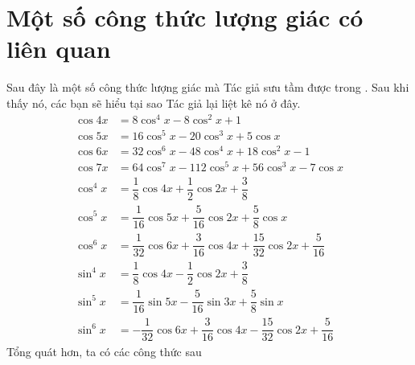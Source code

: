 \documentclass[a4paper,oneside]{book}
\numberwithin{equation}{chapter}
\begin{document}
\section{Một số công thức lượng giác có liên quan}
Sau đây là một số công thức lượng giác mà Tác giả sưu tầm được trong \cite{5}. Sau khi thấy nó, các bạn sẽ hiểu tại sao Tác giả lại liệt kê nó ở đây.\\
\begin{align}
\cos 4x &= 8{\cos ^4}x - 8{\cos ^2}x + 1\\
\cos 5x &= 16{\cos ^5}x - 20{\cos ^3}x + 5\cos x\\
\cos 6x &= 32{\cos ^6}x - 48{\cos ^4}x + 18{\cos ^2}x - 1\\
\cos 7x &= 64{\cos ^7}x - 112{\cos ^5}x + 56{\cos ^3}x - 7\cos x\\
{\cos ^4}x &= \dfrac{1}{8}\cos 4x + \dfrac{1}{2}\cos 2x + \dfrac{3}{8}\\
{\cos ^5}x &= \dfrac{1}{{16}}\cos 5x + \dfrac{5}{{16}}\cos 2x + \dfrac{5}{8}\cos x\\
{\cos ^6}x &= \dfrac{1}{{32}}\cos 6x + \dfrac{3}{{16}}\cos 4x + \dfrac{{15}}{{32}}\cos 2x + \dfrac{5}{{16}}\\
{\sin ^4}x &= \dfrac{1}{8}\cos 4x - \dfrac{1}{2}\cos 2x + \dfrac{3}{8}\\
{\sin ^5}x &= \dfrac{1}{{16}}\sin 5x - \dfrac{5}{{16}}\sin 3x + \dfrac{5}{8}\sin x\\
{\sin ^6}x &=  - \dfrac{1}{{32}}\cos 6x + \dfrac{3}{{16}}\cos 4x - \dfrac{{15}}{{32}}\cos 2x + \dfrac{5}{{16}}
\end{align}
Tổng quát hơn, ta có các công thức sau
\end{document}
